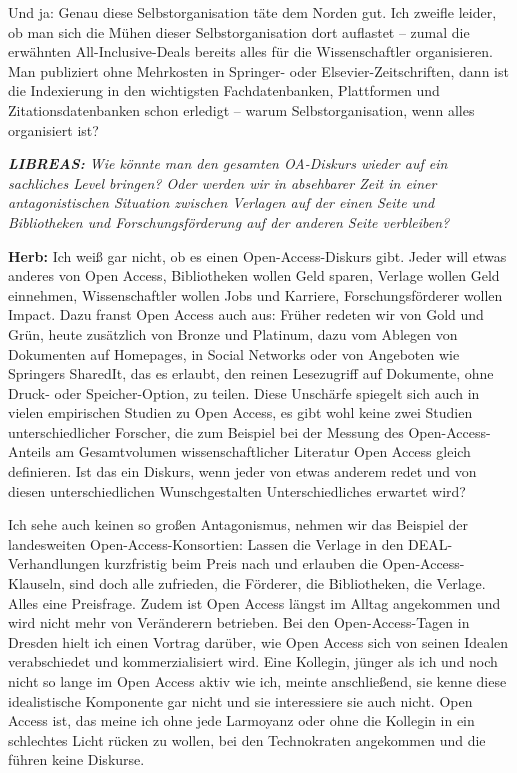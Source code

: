 \documentclass[a4paper,
fontsize=11pt,
oneside,
numbers=noperiodatend,
parskip=half-,
bibliography=totoc,
final
]{scrartcl}
\begin{document}
Und ja: Genau diese Selbstorganisation täte dem Norden gut. Ich zweifle
leider, ob man sich die Mühen dieser Selbstorganisation dort auflastet
-- zumal die erwähnten All-Inclusive-Deals bereits alles für die
Wissenschaftler organisieren. Man publiziert ohne Mehrkosten in
Springer- oder Elsevier-Zeitschriften, dann ist die Indexierung in den
wichtigsten Fachdatenbanken, Plattformen und Zitationsdatenbanken schon
erledigt -- warum Selbstorganisation, wenn alles organisiert ist?

\emph{\textbf{LIBREAS:} Wie könnte man den gesamten OA-Diskurs wieder
auf ein sachliches Level bringen? Oder werden wir in absehbarer Zeit in
einer antagonistischen Situation zwischen Verlagen auf der einen Seite
und Bibliotheken und Forschungsförderung auf der anderen Seite
verbleiben?}

\textbf{Herb:} Ich weiß gar nicht, ob es einen Open-Access-Diskurs gibt.
Jeder will etwas anderes von Open Access, Bibliotheken wollen Geld
sparen, Verlage wollen Geld einnehmen, Wissenschaftler wollen Jobs und
Karriere, Forschungsförderer wollen Impact. Dazu franst Open Access auch
aus: Früher redeten wir von Gold und Grün, heute zusätzlich von Bronze
und Platinum, dazu vom Ablegen von Dokumenten auf Homepages, in Social
Networks oder von Angeboten wie Springers SharedIt, das es erlaubt, den
reinen Lesezugriff auf Dokumente, ohne Druck- oder Speicher-Option, zu
teilen. Diese Unschärfe spiegelt sich auch in vielen empirischen Studien
zu Open Access, es gibt wohl keine zwei Studien unterschiedlicher
Forscher, die zum Beispiel bei der Messung des Open-Access-Anteils am
Gesamtvolumen wissenschaftlicher Literatur Open Access gleich
definieren. Ist das ein Diskurs, wenn jeder von etwas anderem redet und
von diesen unterschiedlichen Wunschgestalten Unterschiedliches erwartet
wird?

Ich sehe auch keinen so großen Antagonismus, nehmen wir das Beispiel der
landesweiten Open-Access-Konsortien: Lassen die Verlage in den
DEAL-Verhandlungen kurzfristig beim Preis nach und erlauben die
Open-Access-Klauseln, sind doch alle zufrieden, die Förderer, die
Bibliotheken, die Verlage. Alles eine Preisfrage. Zudem ist Open Access
längst im Alltag angekommen und wird nicht mehr von Veränderern
betrieben. Bei den Open-Access-Tagen in Dresden hielt ich einen Vortrag
darüber, wie Open Access sich von seinen Idealen verabschiedet und
kommerzialisiert wird. Eine Kollegin, jünger als ich und noch nicht so
lange im Open Access aktiv wie ich, meinte anschließend, sie kenne diese
idealistische Komponente gar nicht und sie interessiere sie auch nicht.
Open Access ist, das meine ich ohne jede Larmoyanz oder ohne die
Kollegin in ein schlechtes Licht rücken zu wollen, bei den Technokraten
angekommen und die führen keine Diskurse.
\end{document}
